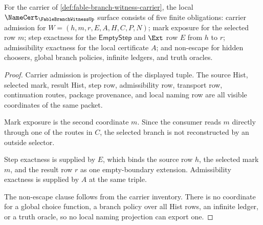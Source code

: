 \begin{theorem}
\label{thm:fable-branch-witness-namecert-obligations}
For the carrier of \autoref{def:fable-branch-witness-carrier}, the local $\NameCert_{\FableBranchWitnessUp}$ surface consists of five finite obligations: carrier admission for $W=(h,m,r,E,A,H,C,P,N)$; mark exposure for the selected row $m$; step exactness for the $\mathsf{EmptyStep}$ and $\Ext$ row $E$ from $h$ to $r$; admissibility exactness for the local certificate $A$; and non-escape for hidden choosers, global branch policies, infinite ledgers, and truth oracles.
\end{theorem}
\begin{proof}
Carrier admission is projection of the displayed tuple. The source Hist, selected mark, result Hist, step row, admissibility row, transport row, continuation routes, package provenance, and local naming row are all visible coordinates of the same packet.

Mark exposure is the second coordinate $m$. Since the consumer reads $m$ directly through one of the routes in $C$, the selected branch is not reconstructed by an outside selector.

Step exactness is supplied by $E$, which binds the source row $h$, the selected mark $m$, and the result row $r$ as one empty-boundary extension. Admissibility exactness is supplied by $A$ at the same triple.

The non-escape clause follows from the carrier inventory. There is no coordinate for a global choice function, a branch policy over all Hist rows, an infinite ledger, or a truth oracle, so no local naming projection can export one.
\end{proof}

